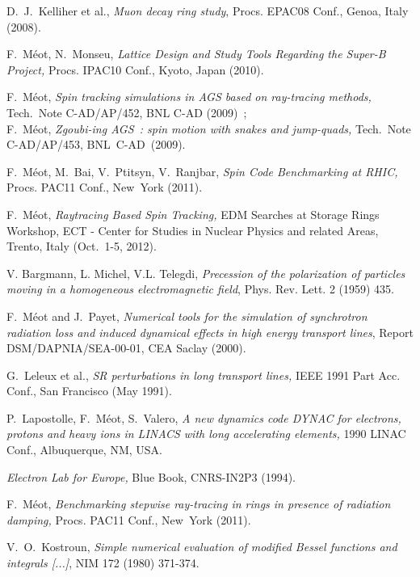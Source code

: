 \begin{thebibliography}{99}
D.~J.~Kelliher et al.,
\textsl{Muon decay ring study}, 
Procs. EPAC08 Conf., Genoa, Italy (2008). 

F.~M\'eot, N.~Monseu, 
\textsl{Lattice Design and Study Tools Regarding the Super-B Project, }
Procs. IPAC10 Conf., Kyoto, Japan (2010). 

F.~M\'eot, 
\textsl{Spin tracking simulations in AGS based on ray-tracing methods, }
Tech.~Note C-AD/AP/452, BNL C-AD (2009)~; \\ 
F.~M\'eot, 
\textsl{Zgoubi-ing AGS~: spin motion with  snakes and jump-quads,   } 
Tech.~Note C-AD/AP/453, BNL~C-AD~(2009). 

F.~M\'eot, M.~Bai, V.~Ptitsyn, V.~Ranjbar, 
\textsl{Spin Code Benchmarking at RHIC,} 
Procs. PAC11 Conf., New~York (2011). 

F.~M\'eot, 
\textsl{Raytracing Based Spin Tracking, } 
EDM Searches at Storage Rings Workshop, 
ECT - Center for Studies in Nuclear Physics and related Areas, 
Trento, Italy (Oct.~1-5, 2012). 


 V. Bargmann, L. Michel, V.L. Telegdi,
\textsl{Precession of the polarization of particles moving in a homogeneous electromagnetic field}, 
Phys. Rev. Lett. 2 (1959) 435.

 F.~M\'eot and J.~Payet, 
\textsl{Numerical tools for the simulation of synchrotron radiation  
loss and induced dynamical effects in high energy transport lines},  
Report DSM/DAPNIA/SEA-00-01, CEA Saclay (2000). 

G.~Leleux et al., 
\textsl{SR perturbations in long transport lines, } 
IEEE 1991 Part Acc. Conf., San Francisco (May 1991). 

P.~Lapostolle, F.~M\'eot, S.~Valero, 
\textsl{A new dynamics code  DYNAC for electrons, protons and heavy ions in LINACS with long accelerating elements, } 
1990 LINAC Conf., Albuquerque, NM, USA. 

\textsl{Electron Lab for Europe, } 
Blue Book, CNRS-IN2P3 (1994). 

F.~M\'eot, 
\textsl{Benchmarking stepwise ray-tracing in rings in presence of radiation damping, }
Procs. PAC11 Conf., New~York (2011). 

V.~O.~Kostroun, 
\textsl{Simple numerical evaluation of modified Bessel functions and integrals [...]}, 
NIM 172 (1980) 371-374. 


\end{thebibliography}
